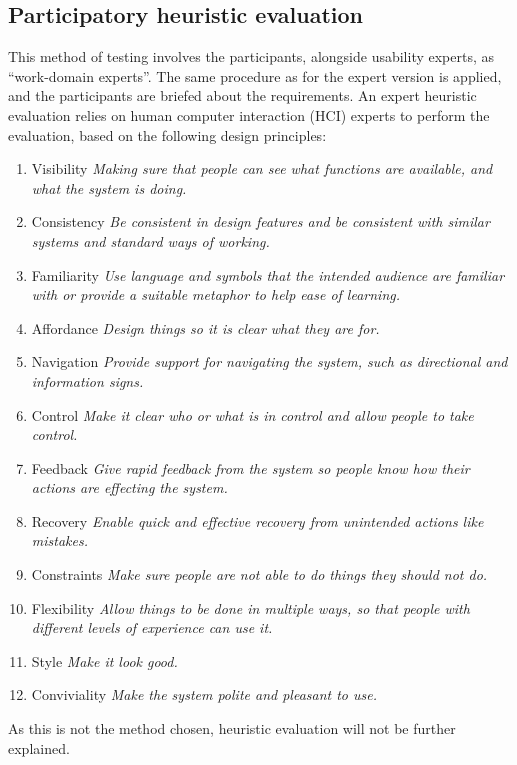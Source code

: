 \subsection{Participatory heuristic evaluation}
This method of testing involves the participants, alongside usability experts, as ``work-domain experts''. The same procedure as for the expert version is applied, and the participants are briefed about the requirements. An expert heuristic evaluation relies on human computer interaction (HCI) experts to perform the evaluation, based on the following design principles:
\begin{enumerate}
	\item Visibility \textit{Making sure that people can see what functions are available, and what the system is doing.}
	\item Consistency \textit{Be consistent in design features and be consistent with similar systems and standard ways of working.}
	\item Familiarity \textit{Use language and symbols that the intended audience are familiar with or provide a suitable metaphor to help ease of learning.}
	\item Affordance \textit{Design things so it is clear what they are for.}
	\item Navigation \textit{Provide support for navigating the system, such as directional and information signs.}
	\item Control \textit{Make it clear who or what is in control and allow people to take control.}
	\item Feedback \textit{Give rapid feedback from the system so people know how their actions are effecting the system.}
	\item Recovery \textit{Enable quick and effective recovery from unintended actions like mistakes.}
	\item Constraints \textit{Make sure people are not able to do things they should not do.}
	\item Flexibility \textit{Allow things to be done in multiple ways, so that people with different levels of experience can use it.}
	\item Style \textit{Make it look good.}
	\item Conviviality \textit{Make the system polite and pleasant to use.}
\end{enumerate}
As this is not the method chosen, heuristic evaluation will not be further explained.
